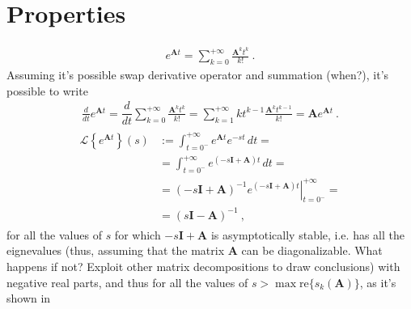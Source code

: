 \documentclass[letterpaper,10pt,english]{jupyterBook}
\begin{document}
\section{Properties}
\label{\detokenize{ch/ode/lti:properties}}\label{\detokenize{ch/ode/lti:ode-lti-matrix-properties}}
\sphinxAtStartPar
{}
\begin{equation*}
\begin{split}e^{\mathbf{A} t} = \sum_{k = 0}^{+\infty} \frac{\mathbf{A}^k t^k}{k!} \ .\end{split}
\end{equation*}
\sphinxAtStartPar
Assuming it’s possible swap derivative operator and summation (when?), it’s possible to write
\begin{equation*}
\begin{split}\frac{d}{dt} e^{\mathbf{A}t} = \dfrac{d}{dt} \sum_{k = 0}^{+\infty} \frac{\mathbf{A}^k t^k}{k!} = \sum_{k=1}^{+\infty} k t^{k-1} \frac{\mathbf{A}^k t^{k-1}}{k!} = \mathbf{A} e^{\mathbf{A} t} \ .\end{split}
\end{equation*}
\sphinxAtStartPar
{}
\begin{equation*}
\begin{split}\begin{aligned}
  \mathscr{L}\left\{ e^{\mathbf{A}t} \right\}(s)
  & := \int_{t=0^-}^{+\infty} e^{\mathbf{A} t} e^{-s t} \, dt = \\
  & = \int_{t=0^-}^{+\infty} e^{(-s\mathbf{I} + \mathbf{A}) t} \, dt = \\
  & = (-s\mathbf{I} + \mathbf{A})^{-1} \left.e^{(-s\mathbf{I} + \mathbf{A}) t}\right|_{t=0^-}^{+\infty} = \\
  & = (s \mathbf{I} - \mathbf{A})^{-1} \ ,
\end{aligned}\end{split}
\end{equation*}
\sphinxAtStartPar
for all the values of \(s\) for which \(-s\mathbf{I} + \mathbf{A}\) is asymptotically stable, i.e. has all the eignevalues (thus, assuming that the matrix \(\mathbf{A}\) can be diagonalizable. What happens if not? Exploit other matrix decompositions to draw conclusions) with negative real parts, and thus for all the values of \(s > \max \text{re}\{ s_k(\mathbf{A}) \}\), as it’s shown in {\hyperref[\detokenize{ch/ode/lti:matrix-stability-spectrum}]{}}
\label{ch/ode/lti:matrix-stability-spectrum}
\end{document}
